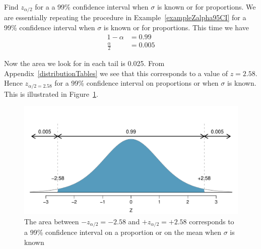 \begin{example}{Find $z_{\alpha/2}$ for a a 99\% confidence interval when $\sigma$ is known or for proportions.} \label{exampleZalpha99CI} 
We are essentially repeating the procedure in Example~\ref{exampleZalpha95CI} for a 99\% confidence interval when $\sigma$ is known or for proportions.
This time we have
\begin{align}
1 - \alpha 		& = 0.99	\\
\frac{\alpha}{2}	& = 0.005
\end{align}

Now the area we look for in each tail is 0.025.
From Appendix~\ref{distributionTables} we see that this corresponds to a value of $z = 2.58$.
Hence $z_{\alpha/2 = 2.58}$ for a 99\% confidence interval on proportions or when $\sigma$ is known.
This is illustrated in Figure~\ref{choosingZFor99CI}.

\begin{figure}[H]
\centering
\includegraphics[width=\textwidth]{04-5/figures2/choosingZFor99CI/choosingZFor99CI.pdf}
\caption{The area between $-z_{\alpha/2}=-2.58$ and $+z_{\alpha/2}=+2.58$ corresponds to a 
99\% confidence interval on a proportion or on the mean when $\sigma$ is known}
\label{choosingZFor99CI}
\end{figure}
\end{example}





